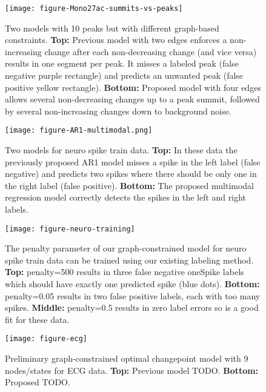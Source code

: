 \documentclass{article}
\begin{document}
\begin{figure}
  \centering
  \texttt{[image: figure-Mono27ac-summits-vs-peaks]}
  \caption{Two models with 10 peaks but with different graph-based
    constraints. \textbf{Top:} Previous model with two edges enforces
    a non-increasing change after each non-decreasing change (and vice
    versa) results in one segment per peak. It misses a labeled peak
    (false negative purple rectangle) and predicts an unwanted peak
    (false positive yellow rectangle). \textbf{Bottom:} Proposed model
    with four edges allows several non-decreasing changes up to a peak
    summit, followed by several non-increasing changes down to
    background noise.}
  \label{fig:summits-vs-peaks}
\end{figure}

\begin{figure}
  \centering
  \texttt{[image: figure-AR1-multimodal.png]}
  \caption{Two models for neuro spike train data. \textbf{Top:} In
    these data the previously proposed AR1 model misses a spike in the
    left label (false negative) and predicts two spikes where there
    should be only one in the right label (false
    positive). \textbf{Bottom:} The proposed multimodal regression
    model correctly detects the spikes in the left and right labels.}
  \label{fig:AR1-multimodal}
\end{figure}

\begin{figure}
  \centering
  \texttt{[image: figure-neuro-training]}
  \caption{The penalty parameter of our graph-constrained model for
    neuro spike train data can be trained using our existing labeling
    method. \textbf{Top:} penalty=500 results in three false negative
    oneSpike labels which should have exactly one predicted spike
    (blue dots). \textbf{Bottom:} penalty=0.05 results in two false
    positive labels, each with too many spikes. \textbf{Middle:}
    penalty=0.5 results in zero label errors so is a good fit for
    these data.}
  \label{fig:neuro-training}
\end{figure}

\begin{figure}
  \centering
  \texttt{[image: figure-ecg]}
  \caption{Preliminary graph-constrained optimal changepoint model
    with 9 nodes/states for ECG data. \textbf{Top:} Previous model
    TODO. \textbf{Bottom:} Proposed TODO.}
  \label{fig:ecg}
\end{figure}



\end{document}
